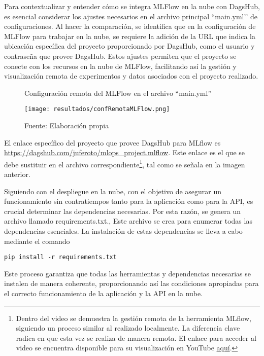 Para contextualizar y entender cómo se integra MLFlow en la nube con DagsHub, es esencial considerar los ajustes necesarios en el archivo principal ``main.yml’’ de configuraciones. Al hacer la comparación, se identifica que en la configuración de MLFlow para trabajar en la nube, se requiere la adición de la URL que indica la ubicación específica del proyecto proporcionado por DagsHub, como el usuario y contraseña que provee DagsHub. Estos ajustes permiten que el proyecto se conecte con los recursos en la nube de MLFlow, facilitando así la gestión y visualización remota de experimentos y datos asociados con el proyecto realizado.

\newpage

\begin{figure}[h]
\centering
\caption{Configuración remota del MLFlow en el archivo ``main.yml''}
\texttt{[image: resultados/confRemotaMLFlow.png]}
\caption*{\footnotesize Fuente: Elaboración propia}
\label{fig:figuraOpcionesMLFlow}
\end{figure}

El enlace específico del proyecto que provee DagsHub para MLflow es \href{https://dagshub.com/juferoto/mlops_project.mlflow}{https://dagshub.com/juferoto/mlops_project.mlflow}. Este enlace es el que se debe sustituir en el archivo correspondiente\footnote{Dentro del video se demuestra la gestión remota de la herramienta MLflow, siguiendo un proceso similar al realizado localmente. La diferencia clave radica en que esta vez se realiza de manera remota. El enlace para acceder al video se encuentra disponible para su visualización en YouTube \href{https://youtu.be/U2DqNOixHWw?si=OrJcIFpGiqfodAQy}{aquí}.}, tal como se señala en la imagen anterior.

Siguiendo con el despliegue en la nube, con el objetivo de asegurar un funcionamiento sin contratiempos tanto para la aplicación como para la API, es crucial determinar las dependencias necesarias. Por esta razón, se genera un archivo llamado requirements.txt., Este archivo se crea para enumerar todas las dependencias esenciales. La instalación de estas dependencias se lleva a cabo mediante el comando 
\begin{verbatim}
pip install -r requirements.txt
\end{verbatim} 

Este proceso garantiza que todas las herramientas y dependencias necesarias se instalen de manera coherente, proporcionando así las condiciones apropiadas para el correcto funcionamiento de la aplicación y la API en la nube.


\newpage